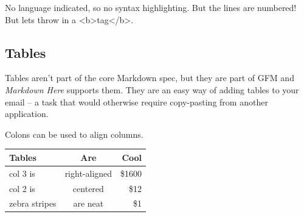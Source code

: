 \documentclass[
]{article}
\newenvironment{Shaded}{}{}
\newcommand{\NormalTok}[1]{#1}
\begin{document}
\begin{Shaded}
\begin{Highlighting}[numbers=left,,]
\NormalTok{No language indicated, so no syntax highlighting. But the lines are numbered!}
\NormalTok{But let\textquotesingle{}s throw in a \textless{}b\textgreater{}tag\textless{}/b\textgreater{}.}
\end{Highlighting}
\end{Shaded}

\subsection{Tables}\label{tables}

Tables aren't part of the core Markdown spec, but they are part of GFM
and \emph{Markdown Here} supports them. They are an easy way of adding
tables to your email -- a task that would otherwise require copy-pasting
from another application.

\begin{Shaded}
\end{Shaded}

Colons can be used to align columns.

\begin{longtable}[]{@{}lcr@{}}
\toprule\noalign{}
Tables & Are & Cool \\
\midrule\noalign{}
\endhead
\bottomrule\noalign{}
\endlastfoot
col 3 is & right-aligned & \$1600 \\
col 2 is & centered & \$12 \\
zebra stripes & are neat & \$1 \\
\end{longtable}
\end{document}
